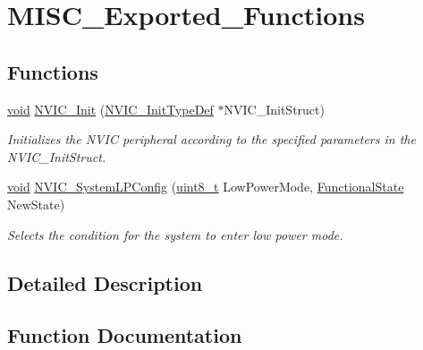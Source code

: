 \hypertarget{group___m_i_s_c___exported___functions}{}\section{M\+I\+S\+C\+\_\+\+Exported\+\_\+\+Functions}
\label{group___m_i_s_c___exported___functions}
\subsection*{Functions}
\begin{DoxyCompactItemize}
\item 
\hyperlink{usb__devapi_8h_afabf60e7f57651d6d595a02c75f07cd0}{void} \hyperlink{group___m_i_s_c___exported___functions_ga4ab373ed0870c06fca5eb51d639adf41}{N\+V\+I\+C\+\_\+\+Init} (\hyperlink{struct_n_v_i_c___init_type_def}{N\+V\+I\+C\+\_\+\+Init\+Type\+Def} $\ast$N\+V\+I\+C\+\_\+\+Init\+Struct)
\begin{DoxyCompactList}\small\item\em Initializes the N\+V\+IC peripheral according to the specified parameters in the N\+V\+I\+C\+\_\+\+Init\+Struct. \end{DoxyCompactList}\item 
\hyperlink{usb__devapi_8h_afabf60e7f57651d6d595a02c75f07cd0}{void} \hyperlink{group___m_i_s_c___exported___functions_gae21011c5232f5b8f366acbecd12a1d4a}{N\+V\+I\+C\+\_\+\+System\+L\+P\+Config} (\hyperlink{_p_e___types_8h_aba7bc1797add20fe3efdf37ced1182c5}{uint8\+\_\+t} Low\+Power\+Mode, \hyperlink{agilefox_2library_2inc_2stm32f10x__type_8h_ac9a7e9a35d2513ec15c3b537aaa4fba1}{Functional\+State} New\+State)
\begin{DoxyCompactList}\small\item\em Selects the condition for the system to enter low power mode. \end{DoxyCompactList}\end{DoxyCompactItemize}


\subsection{Detailed Description}


\subsection{Function Documentation}
